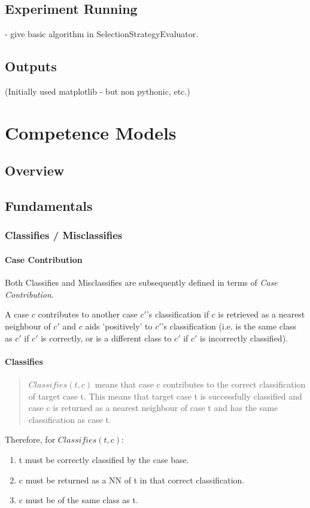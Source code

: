 \documentclass[a4paper,11pt]{report}
\begin{document}
\section{Experiment Running}
- give basic algorithm in SelectionStrategyEvaluator.
\section{Outputs}
(Initially used matplotlib - but non pythonic, etc.)
\chapter{Competence Models}
\section{Overview}
\section{Fundamentals}
\subsection{Classifies / Misclassifies}
\subsubsection{Case Contribution\label{sec:contributes}}
Both Classifies and Misclassifies are subsequently defined in terms of \emph{Case Contribution}.

A case $c$ contributes to another case $c\prime$'s classification if $c$ is retrieved as a nearest neighbour of $c\prime$ and $c$ aids 'positively' to $c\prime$'s classification (i.e. is the same class as $c\prime$ if $c\prime$ is correctly, or is a different class to  $c\prime$ if  $c\prime$ is incorrectly classified).
\subsubsection{Classifies}
\begin{quote}
$ Classifies(t, c) $ means that case c contributes to the correct classification of target case t. This means that target case t is successfully classified and case c is returned as a nearest neighbour of case t and has the same classification as case t.
\end{quote}
\citet{Delany2009}

Therefore, for $ Classifies(t, c) $:
\begin{enumerate}
	\item t must be correctly classified by the case base.
	\item c must be returned as a NN of t in that correct classification.
	\item c must be of the same class as t.
\end{enumerate}
\end{document}
